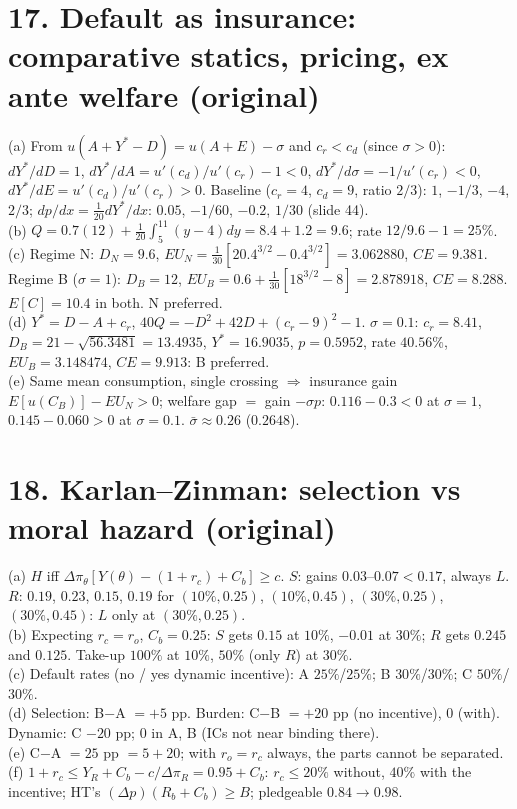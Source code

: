 \documentclass[11pt,a4paper]{article}
\begin{document}
\section*{17. Default as insurance: comparative statics, pricing, ex ante welfare (original)}
(a) From $u(A+Y^*-D)=u(A+E)-\sigma$ and $c_r<c_d$ (since $\sigma>0$): $dY^*/dD=1$, $dY^*/dA=u'(c_d)/u'(c_r)-1<0$,
$dY^*/d\sigma=-1/u'(c_r)<0$, $dY^*/dE=u'(c_d)/u'(c_r)>0$. Baseline ($c_r=4$, $c_d=9$, ratio $2/3$): $1$, $-1/3$, $-4$, $2/3$;
$dp/dx=\tfrac1{20}dY^*/dx$: $0.05$, $-1/60$, $-0.2$, $1/30$ (slide 44).\\
(b) $Q=0.7(12)+\tfrac1{20}\int_5^{11}(y-4)dy=8.4+1.2=9.6$; rate $12/9.6-1=25\%$.\\
(c) Regime N: $D_N=9.6$, $EU_N=\tfrac1{30}[20.4^{3/2}-0.4^{3/2}]=3.062880$, $CE=9.381$. Regime B ($\sigma=1$): $D_B=12$,
$EU_B=0.6+\tfrac1{30}[18^{3/2}-8]=2.878918$, $CE=8.288$. $E[C]=10.4$ in both. N preferred.\\
(d) $Y^*=D-A+c_r$, $40Q=-D^2+42D+(c_r-9)^2-1$. $\sigma=0.1$: $c_r=8.41$, $D_B=21-\sqrt{56.3481}=13.4935$,
$Y^*=16.9035$, $p=0.5952$, rate $40.56\%$, $EU_B=3.148474$, $CE=9.913$: B preferred.\\
(e) Same mean consumption, single crossing $\Rightarrow$ insurance gain $E[u(C_B)]-EU_N>0$; welfare gap $=$ gain
$-\sigma p$: $0.116-0.3<0$ at $\sigma=1$, $0.145-0.060>0$ at $\sigma=0.1$. $\bar\sigma\approx0.26$ ($0.2648$).

\section*{18. Karlan--Zinman: selection vs moral hazard (original)}
(a) $H$ iff $\Delta\pi_\theta[Y(\theta)-(1+r_c)+C_b]\ge c$. $S$: gains $0.03$--$0.07<0.17$, always $L$. $R$: $0.19$, $0.23$,
$0.15$, $0.19$ for $(10\%,0.25)$, $(10\%,0.45)$, $(30\%,0.25)$, $(30\%,0.45)$: $L$ only at $(30\%,0.25)$.\\
(b) Expecting $r_c=r_o$, $C_b=0.25$: $S$ gets $0.15$ at $10\%$, $-0.01$ at $30\%$; $R$ gets $0.245$ and $0.125$.
Take-up $100\%$ at $10\%$, $50\%$ (only $R$) at $30\%$.\\
(c) Default rates (no / yes dynamic incentive): A $25\%$/$25\%$; B $30\%$/$30\%$; C $50\%$/$30\%$.\\
(d) Selection: B$-$A $=+5$ pp. Burden: C$-$B $=+20$ pp (no incentive), $0$ (with). Dynamic: C $-20$ pp; $0$ in A, B
(ICs not near binding there).\\
(e) C$-$A $=25$ pp $=5+20$; with $r_o=r_c$ always, the parts cannot be separated.\\
(f) $1+r_c\le Y_R+C_b-c/\Delta\pi_R=0.95+C_b$: $r_c\le20\%$ without, $40\%$ with the incentive; HT's $(\Delta p)(R_b+C_b)\ge B$;
pledgeable $0.84\to0.98$.
\end{document}
